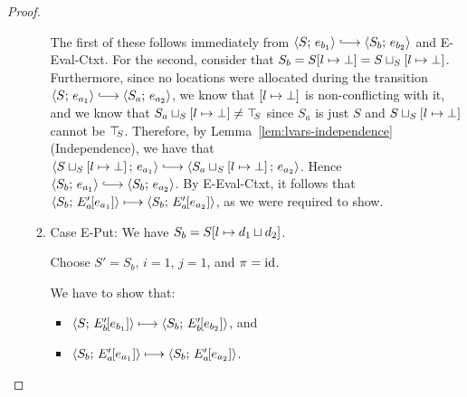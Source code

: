 \begin{proof}
\begin{enumerate}
\begin{enumerate}
      The first of these follows immediately from $\config{S}{e_{b_1}}
      \parstepsto \config{S_b}{e_{b_2}}$ and {\sc E-Eval-Ctxt}.  For
      the second, consider that $S_b = S[l \mapsto \bot] =
      S \sqcup_{S} \left[ l \mapsto \bot \right]$.  Furthermore,
      since no locations were allocated during the transition
      $\config{S}{e_{a_1}} \parstepsto \config{S_a}{e_{a_2}}$, we know
      that $\left[ l \mapsto \bot \right]$ is non-conflicting with
      it, and we know that
      $S_a \sqcup_{S} \left[ l \mapsto \bot \right] \neq \top\hspace{-0.85mm}_{S}$
      since $S_a$ is just $S$ and
      $S \sqcup_{S} \left[ l \mapsto \bot \right]$ cannot be
      $\top\hspace{-0.85mm}_{S}$.  Therefore, by Lemma~\ref{lem:lvars-independence}
      (Independence), we have that
      $\config{\lubstore{S}{\store{\storebindingRaw{l}{\bot}}}}{e_{a_1}}
      \parstepsto
      \config{\lubstore{S_a}{\store{\storebindingRaw{l}{\bot}}}}{e_{a_2}}$.
      Hence $\config{S_b}{e_{a_1}} \parstepsto \config{S_b}{e_{a_2}}$.
      By {\sc E-Eval-Ctxt}, it follows that
      $\langle S_b;\, E'_a\hspace{-1mm}\left[e_{a_1}\right] \rangle \longmapsto
      \langle S_b;\, E'_a\hspace{-1mm}\left[e_{a_2}\right] \rangle$, as we were required to
      show.

    \item \label{lvars-slc-beta-put}Case {\sc E-Put}: We have $S_b =
      S[l \mapsto d_1 \sqcup d_2]$.

      Choose $S' = S_b$, $i = 1$, $j = 1$, and $\pi = \mathrm{id}$.

      We have to show that:
      \begin{itemize}
      \item $\langle S;\, E'_b\hspace{-1mm}\left[e_{b_1}\right] \rangle \longmapsto
        \langle S_b;\, E'_b\hspace{-1mm}\left[e_{b_2}\right] \rangle$, and
      \item
        $\langle S_b;\, E'_a\hspace{-1mm}\left[e_{a_1}\right] \rangle \longmapsto
        \langle S_b;\, E'_a\hspace{-1mm}\left[e_{a_2}\right] \rangle$.
      \end{itemize}


\end{enumerate}
\end{enumerate}
\end{proof}
